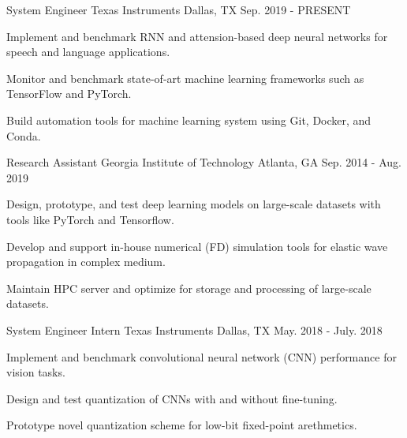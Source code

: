 

\begin{cventries}

\cventry
{System Engineer} %
{Texas Instruments} %
{Dallas, TX} %
{Sep. 2019 - PRESENT} %
{
    \begin{cvitems} %
        \item {Implement and benchmark RNN and attension-based deep neural networks for speech and language applications.}
        \item {Monitor and benchmark state-of-art machine learning frameworks such as TensorFlow and PyTorch.}
        \item {Build automation tools for machine learning system using Git, Docker, and Conda.}
    \end{cvitems}
}

  \cventry
    {Research Assistant} %
    {Georgia Institute of Technology} %
    {Atlanta, GA} %
    {Sep. 2014 - Aug. 2019} %
    {
      \begin{cvitems} %
        \item {Design, prototype, and test deep learning models on large-scale datasets with tools like PyTorch and Tensorflow.}
        \item {Develop and support in-house numerical (FD) simulation tools for elastic wave propagation in complex medium.}
        \item {Maintain HPC server and optimize for storage and processing of large-scale datasets.}
      \end{cvitems}
    }

\cventry
{System Engineer Intern} %
{Texas Instruments} %
{Dallas, TX} %
{May. 2018 - July. 2018} %
{
    \begin{cvitems} %
        \item {Implement and benchmark convolutional neural network (CNN) performance for vision tasks.}
        \item {Design and test quantization of CNNs with and without fine-tuning.}
        \item {Prototype novel quantization scheme for low-bit fixed-point arethmetics.}
    \end{cvitems}
}


\end{cventries}
